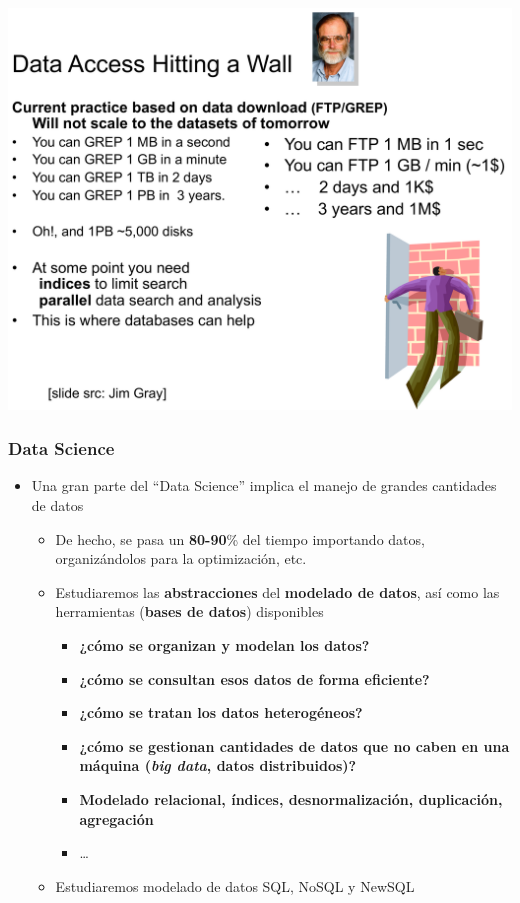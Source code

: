 \documentclass[14pt]{beamer}
\begin{document}
\begin{frame}[plain]
  \includegraphics[width=\textwidth]{img/gray-grep}
\end{frame}


\begin{frame}
\frametitle{Data Science}
\begin{itemize}
\item Una gran parte del ``Data Science'' implica el manejo de grandes
  cantidades de datos
  \begin{itemize}
  \item De hecho, se pasa un {\bf 80-90}\% del tiempo importando datos,
    organizándolos para la optimización, etc.
  \item Estudiaremos las {\bf abstracciones} del {\bf modelado de datos},
    así como las herramientas ({\bf bases de datos}) disponibles
    \begin{itemize}
    \item {\bf ¿cómo se organizan y modelan los datos?}
    \item {\bf ¿cómo se consultan esos datos de forma eficiente?}
    \item {\bf ¿cómo se tratan los datos heterogéneos?}
    \item {\bf ¿cómo se gestionan cantidades de datos que no caben en una
        máquina ({\itshape big data}, datos distribuidos)?}
    \item {\bf Modelado relacional, índices, desnormalización, duplicación,
        agregación}
    \item \ldots

    \end{itemize}
  \item Estudiaremos modelado de datos SQL, NoSQL y NewSQL

  \end{itemize}
\end{itemize}
\end{frame}
\end{document}
